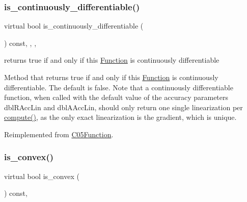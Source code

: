 \subsubsection{\texorpdfstring{is\+\_\+continuously\+\_\+differentiable()}{is\_continuously\_differentiable()}}
{\footnotesize\ttfamily virtual bool is\+\_\+continuously\+\_\+differentiable (\begin{DoxyParamCaption}\item[{void}]{ }\end{DoxyParamCaption}) const\hspace{0.3cm}{\ttfamily [inline]}, {\ttfamily [final]}, {\ttfamily [override]}, {\ttfamily [virtual]}}



returns true if and only if this \mbox{\hyperlink{class_s_m_spp__di__unipi__it_1_1_function}{Function}} is continuously differentiable 

Method that returns true if and only if this \mbox{\hyperlink{class_s_m_spp__di__unipi__it_1_1_function}{Function}} is continuously differentiable. The default is false. Note that a continuously differentiable function, when called with the default value of the accuracy parameters dbl\+R\+Acc\+Lin and dbl\+A\+Acc\+Lin, should only return one single linearization per \mbox{\hyperlink{class_s_m_spp__di__unipi__it_1_1_function_a504d4e3e174c7a518cc66156a8a45ce5}{compute()}}, as the only exact linearization is the gradient, which is unique. 

Reimplemented from \mbox{\hyperlink{class_s_m_spp__di__unipi__it_1_1_c05_function_ade71194d2205da239374eeeb8ba82b11}{C05\+Function}}.

\mbox{\label{class_s_m_spp__di__unipi__it_1_1_d_quad_function_a20a6d803edcf5c8ae8b702b8a010af54}} 
\subsubsection{\texorpdfstring{is\+\_\+convex()}{is\_convex()}}
{\footnotesize\ttfamily virtual bool is\+\_\+convex (\begin{DoxyParamCaption}\item[{void}]{ }\end{DoxyParamCaption}) const\hspace{0.3cm}{\ttfamily [override]}, {\ttfamily [virtual]}}



